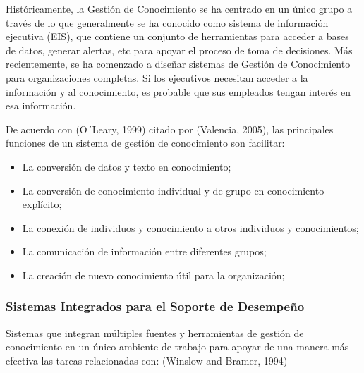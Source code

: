 Históricamente, la Gestión de Conocimiento se ha centrado en un único grupo a través de lo que generalmente se ha conocido como sistema de información ejecutiva (EIS), que contiene un conjunto de herramientas para acceder a bases de datos, generar alertas, etc para apoyar el proceso de toma de decisiones. Más recientemente, se ha comenzado a diseñar sistemas de Gestión de Conocimiento para organizaciones completas. Si los ejecutivos necesitan acceder a la información y al conocimiento, es probable que sus empleados tengan interés en esa información.
 
De acuerdo con (O´Leary, 1999) citado por (Valencia, 2005), las principales funciones de un sistema de gestión de conocimiento son facilitar:

\begin{itemize}
\item La conversión de datos y texto en conocimiento;
\item La conversión de conocimiento individual y de grupo en conocimiento explícito;
\item La conexión de individuos y conocimiento a otros individuos y conocimientos;
\item La comunicación de información entre diferentes grupos;
\item La creación de nuevo conocimiento útil para la organización;
\end{itemize}

\subsubsection{Sistemas Integrados para el Soporte de Desempeño}

Sistemas que integran múltiples fuentes y herramientas de gestión de conocimiento en un único ambiente de trabajo para apoyar de una manera más efectiva las tareas relacionadas con: (Winslow and Bramer, 1994)

